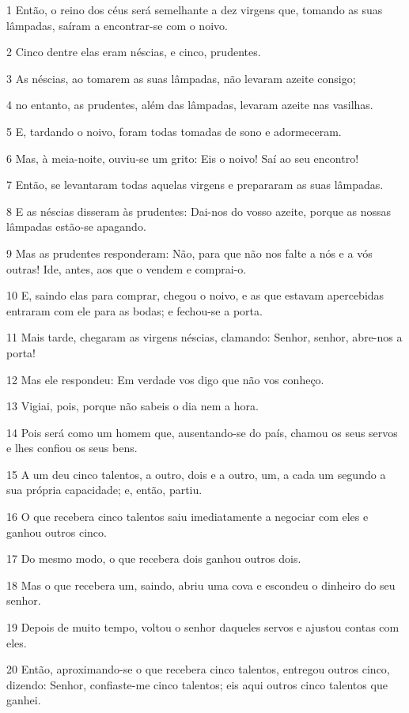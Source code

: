 \par 1 Então, o reino dos céus será semelhante a dez virgens que, tomando as suas lâmpadas, saíram a encontrar-se com o noivo.
\par 2 Cinco dentre elas eram néscias, e cinco, prudentes.
\par 3 As néscias, ao tomarem as suas lâmpadas, não levaram azeite consigo;
\par 4 no entanto, as prudentes, além das lâmpadas, levaram azeite nas vasilhas.
\par 5 E, tardando o noivo, foram todas tomadas de sono e adormeceram.
\par 6 Mas, à meia-noite, ouviu-se um grito: Eis o noivo! Saí ao seu encontro!
\par 7 Então, se levantaram todas aquelas virgens e prepararam as suas lâmpadas.
\par 8 E as néscias disseram às prudentes: Dai-nos do vosso azeite, porque as nossas lâmpadas estão-se apagando.
\par 9 Mas as prudentes responderam: Não, para que não nos falte a nós e a vós outras! Ide, antes, aos que o vendem e comprai-o.
\par 10 E, saindo elas para comprar, chegou o noivo, e as que estavam apercebidas entraram com ele para as bodas; e fechou-se a porta.
\par 11 Mais tarde, chegaram as virgens néscias, clamando: Senhor, senhor, abre-nos a porta!
\par 12 Mas ele respondeu: Em verdade vos digo que não vos conheço.
\par 13 Vigiai, pois, porque não sabeis o dia nem a hora.
\par 14 Pois será como um homem que, ausentando-se do país, chamou os seus servos e lhes confiou os seus bens.
\par 15 A um deu cinco talentos, a outro, dois e a outro, um, a cada um segundo a sua própria capacidade; e, então, partiu.
\par 16 O que recebera cinco talentos saiu imediatamente a negociar com eles e ganhou outros cinco.
\par 17 Do mesmo modo, o que recebera dois ganhou outros dois.
\par 18 Mas o que recebera um, saindo, abriu uma cova e escondeu o dinheiro do seu senhor.
\par 19 Depois de muito tempo, voltou o senhor daqueles servos e ajustou contas com eles.
\par 20 Então, aproximando-se o que recebera cinco talentos, entregou outros cinco, dizendo: Senhor, confiaste-me cinco talentos; eis aqui outros cinco talentos que ganhei.
